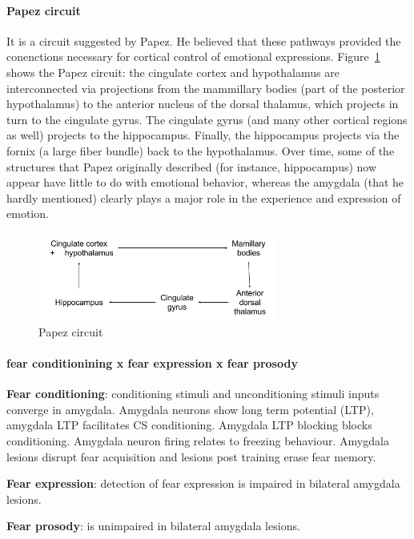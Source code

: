 \documentclass[12pt,article,oneside,a4paper]{memoir}
\begin{document}
\paragraph{Papez circuit}
It is a circuit suggested by Papez. He believed that these pathways provided
the conenctions necessary for cortical control of emotional expressions.
Figure~\ref{fig:papez-circuit} shows the Papez circuit: the cingulate cortex
and hypothalamus are interconnected via projections from the mammillary bodies
(part of the posterior hypothalamus) to the anterior nucleus of the dorsal
thalamus, which projects in turn to the cingulate gyrus.
The cingulate gyrus (and many other cortical regions as well) projects to the
hippocampus. Finally, the hippocampus projects via the fornix (a large fiber
bundle) back to the hypothalamus. Over time, some of the structures that Papez
originally described (for instance, hippocampus) now appear have little to do 
with emotional behavior, whereas the amygdala (that he hardly mentioned)
clearly plays a major role in the experience and expression of emotion.

\begin{figure}
  \centering
  \includegraphics[width=0.7\textwidth]{imgs/papez-circuit.png}
  \caption{Papez circuit}
  \label{fig:papez-circuit}
\end{figure}

\paragraph{fear conditionining x fear expression x fear prosody}
\textbf{Fear conditioning}: conditioning stimuli and unconditioning stimuli
inputs converge in amygdala. Amygdala neurons show long term potential (LTP),
amygdala LTP facilitates CS conditioning. Amygdala LTP blocking blocks
conditioning. Amygdala neuron firing relates to freezing behaviour. Amygdala
lesions disrupt fear acquisition and lesions post training erase fear memory.

\textbf{Fear expression}: detection of fear expression is impaired in bilateral
amygdala lesions.

\textbf{Fear prosody}: is unimpaired in bilateral amygdala lesions.
\end{document}
